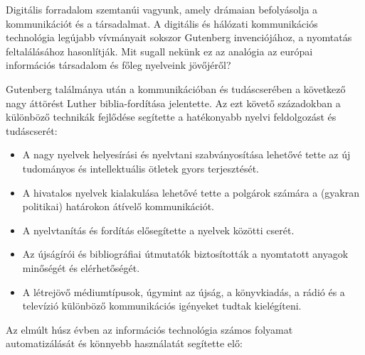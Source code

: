\clearpage



\begin{multicols}{2}

Digitális forradalom szemtanúi vagyunk, amely drámaian befolyásolja a kommunikációt és a társadalmat. A digitális és hálózati kommunikációs technológia legújabb vívmányait sokszor Gutenberg invenciójához, a nyomtatás feltalálásához hasonlítják. Mit sugall nekünk ez az analógia az európai információs társadalom és főleg nyelveink jövőjéről? 


Gutenberg találmánya után a kommunikációban és tudáscserében a következő nagy áttörést Luther biblia-fordítása jelentette. Az ezt követő századokban a különböző technikák fejlődése segítette a hatékonyabb nyelvi feldolgozást és tu\-dás\-cse\-rét:

\medskip
\begin{itemize}
\item A nagy nyelvek helyesírási és nyelvtani szabványosítása lehetővé tette az új tudományos és intellektuális ötletek gyors terjesztését.
\item A hivatalos nyelvek kialakulása le\-he\-tő\-vé tette a polgárok számára a (gyakran politikai) határokon átívelő kommunikációt.
\item A nyelvtanítás és fordítás elősegítette a nyelvek közötti cserét.
\item Az újságírói és bibliográfiai útmutatók biztosították a nyomtatott anyagok minőségét és elérhetőségét.
\medskip
\item A létrejövő médiumtípusok, úgymint az újság, a könyvkiadás, a rádió és a televízió különböző kommunikációs igényeket tudtak kielégíteni.
\end{itemize}

Az elmúlt húsz évben az információs technológia számos folyamat automatizálását és könnyebb használatát segítette elő:


\end{multicols}
